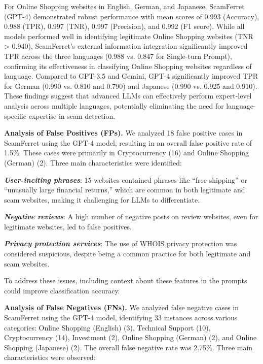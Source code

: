 \documentclass[runningheads]{llncs}
\begin{document}
For Online Shopping websites in English, German, and Japanese, ScamFerret (GPT-4) demonstrated robust performance with mean scores of 0.993 (Accuracy), 0.988 (TPR), 0.997 (TNR), 0.997 (Precision), and 0.992 (F1 score).
While all models performed well in identifying legitimate Online Shopping websites (TNR > 0.940), ScamFerret's external information integration significantly improved TPR across the three languages (0.988 vs. 0.847 for Single-turn Prompt), confirming its effectiveness in classifying Online Shopping websites regardless of language.
Compared to GPT-3.5 and Gemini, GPT-4 significantly improved TPR for German (0.990 vs. 0.810 and 0.790) and Japanese (0.990 vs. 0.925 and 0.910).
These findings suggest that advanced LLMs can effectively perform expert-level analysis across multiple languages, potentially eliminating the need for language-specific expertise in scam detection.


\noindent\textbf{Analysis of False Positives (FPs).}
We analyzed 18 false positive cases in ScamFerret using the GPT-4 model, resulting in an overall false positive rate of 1.5\%.
These cases were primarily in Cryptocurrency (16) and Online Shopping (German) (2).
Three main characteristics were identified:

\noindent\textbf{\textit{User-inciting phrases}}:
15 websites contained phrases like ``free shipping'' or ``unusually large financial returns,'' which are common in both legitimate and scam websites, making it challenging for LLMs to differentiate.

\noindent\textbf{\textit{Negative reviews}}:
A high number of negative posts on review websites, even for legitimate websites, led to false positives.

\noindent\textbf{\textit{Privacy protection services}}:
The use of WHOIS privacy protection was considered suspicious, despite being a common practice for both legitimate and scam websites.

To address these issues, including context about these features in the prompts could improve classification accuracy.

\noindent\textbf{Analysis of False Negatives (FNs).}
We analyzed false negative cases in ScamFerret using the GPT-4 model, identifying 33 instances across various categories: Online Shopping (English) (3), Technical Support (10), Cryptocurrency (14), Investment (2), Online Shopping (German) (2), and Online Shopping (Japanese) (2). The overall false negative rate was 2.75\%.
Three main characteristics were observed:
\end{document}
